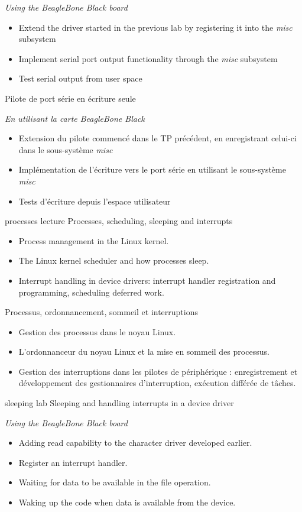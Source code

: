 {
  {\em Using the BeagleBone Black board}
  \begin{itemize}
  \item Extend the driver started in the previous lab by registering
    it into the {\em misc} subsystem
  \item Implement serial port output functionality through the {\em
      misc} subsystem
  \item Test serial output from user space
  \end{itemize}
}
{Pilote de port série en écriture seule}
{
  {\em En utilisant la carte BeagleBone Black}
  \begin{itemize}
  \item Extension du pilote commencé dans le TP précédent, en
    enregistrant celui-ci dans le sous-système {\em misc}
  \item Implémentation de l'écriture vers le port série en
    utilisant le sous-système {\em misc}
  \item Tests d'écriture depuis l'espace utilisateur
  \end{itemize}
}
{processes}
{lecture}
{Processes, scheduling, sleeping and interrupts}
{
  \begin{itemize}
  \item Process management in the Linux kernel.
  \item The Linux kernel scheduler and how processes sleep.
  \item Interrupt handling in device drivers: interrupt handler
    registration and programming, scheduling deferred work.
  \end{itemize}
}
{Processus, ordonnancement, sommeil et interruptions}
{
  \begin{itemize}
  \item Gestion des processus dans le noyau Linux.
  \item L'ordonnanceur du noyau Linux et la mise en sommeil des processus.
  \item Gestion des interruptions dans les pilotes de périphérique :
    enregistrement et développement des gestionnaires d'interruption,
    exécution différée de tâches.
  \end{itemize}
}
{sleeping}
{lab}
{Sleeping and handling interrupts in a device driver}
{
  {\em Using the BeagleBone Black board}
  \begin{itemize}
  \item Adding read capability to the character driver developed
    earlier.
  \item Register an interrupt handler.
  \item Waiting for data to be available in the  file operation.
  \item Waking up the code when data is available from the device.
  \end{itemize}
}
